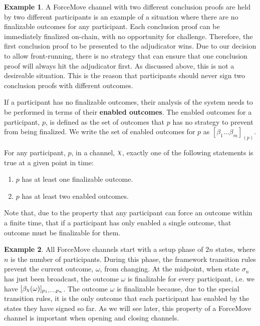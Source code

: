 \documentclass{article}
\DeclareRobustCommand{\rchi}{{\mathpalette\irchi\relax}}
\newcommand{\irchi}[2]{\raisebox{\depth}{$#1\chi$}} %
\theoremstyle{definition}
\newtheorem{example}{Example}[section]
\newcommand{\enf}[1]{[#1]}
\begin{document}
\begin{example}
A ForceMove channel with two different conclusion proofs are held by two different participants
is an example of a situation where there are no finalizable outcomes for any participant.
Each conclusion proof can be immediately finalized on-chain, with no opportunity for challenge.
Therefore, the first conclusion proof to be presented to the adjudicator wins. 
Due to our decision to allow front-running, there is no strategy that can ensure that one
conclusion proof will always hit the adjudicator first.
As discussed above, this is not a desireable situation.
This is the reason that participants should never sign two conclusion proofs
with different outcomes.
\end{example}

If a participant has no finalizable outcomes, their analysis of the system needs to be performed
in terms of their \textbf{enabled outcomes}.
The enabled outcomes for a participant, $p$, is defined as the set of outcomes that $p$ has
no strategy to prevent from being finalized.
We write the set of enabled outcomes for $p$ as $\enf{\beta_1 \dots \beta_m}_{(p)}$.

For any participant, $p$, in a channel, $\rchi$, exactly one of the following statements is
true at a given point in time:
\begin{enumerate}
  \item $p$ has at least one finalizable outcome.
  \item $p$ has at least two enabled outcomes.
\end{enumerate}
Note that, due to the property that any participant can force an outcome within a finite time,
that if a participant has only enabled a single outcome, that outcome must be finalizable for them.

\begin{example}{}
  All ForceMove channels start with a setup phase of $2n$ states, where $n$ is the number of participants.
  During this phase, the framework transition rules prevent the current outcome, $\omega$, from changing.
  At the midpoint, when state $\sigma_n$ has just been broadcast, the outcome
  $\omega$ is finalizable for every participant, i.e. we have
  $\enf{\beta_\rchi(\omega)}_{p_1, \dots, p_n}$.
  The outcome $\omega$ is finalizable because, due to the special transition rules,
  it is the only outcome that each participant has enabled by the states they have signed so far.
  As we will see later, this property of a ForceMove channel is important when opening and
  closing channels.
\end{example}
\end{document}
